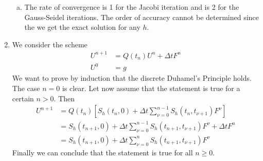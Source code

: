 \documentclass[10pt,a4paper,twoside, french]{article}
\numberwithin{equation}{section}
\numberwithin{figure}{section}
\numberwithin{table}{section}
\begin{document}
\begin{enumerate}
\begin{enumerate}[a.]
\item The rate of convergence is 1 for the Jacobi iteration and is 2 for the Gauss-Seidel iterations. The order of accuracy cannot be determined since the we get the exact solution for any $h$.
\end{enumerate}

\setcounter{section}{2}
\item We consider the scheme
\begin{align*}
U^{n+1} & = Q(t_n)U^n+\Delta t F^n \\
U^0 & = g
\end{align*}
We want to prove by induction that the discrete Duhamel's Principle holds.\\
The case $n=0$ is clear. Let now assume that the statement is true for a certain $n >0$. Then
\begin{align*}
U^{n+1} & = Q(t_n) \left[ S_h(t_n,0) + \Delta t \sum_{\nu =0}^{n-1} S_h(t_n,t_{\nu+1})F^\nu   \right] \\
 & = S_h(t_{n+1},0) + \Delta t \sum_{\nu=0}^{n-1} S_h(t_{n+1},t_{\nu +1})F^\nu + \Delta t F^n \\
 & = S_h(t_{n+1},0) + \Delta t \sum_{\nu=0}^n S_h(t_{n+1},t_{\nu+1})F^\nu
\end{align*}
Finally we can conclude that the statement is true for all $n \geq 0$.


\end{enumerate}
\end{document}
